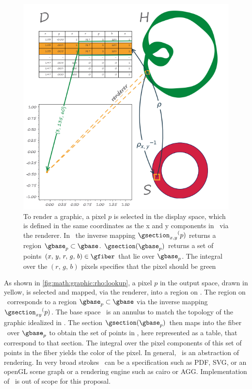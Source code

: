 \documentclass[../main.tex]{subfiles}
\begin{document}
\begin{figure}[H]
    \includegraphics[width=\textwidth]{figures/math/render.png}
    \caption{To render a graphic, a pixel $p$ is selected in the display space, which is defined in the same coordinates as the x and y components in \gfiber\ via the renderer. In \gtotal\, the inverse mapping ${\gsection_{x,y}}^(p)$ returns a region $\gbase_{p} \subset \gbase$. $\gsection(\gbase_{p})$ returns a set of points $(x,\,y,\,r,\,g,\,b) \in \gfiber$ that lie over $\gbase_{p}$. The integral over the $(r,\,g,\,b)$ pixels specifies that the pixel should be green}
    \label{fig:math:graphic:rho:lookup}
\end{figure}

As shown in \autoref{fig:math:graphic:rho:lookup}, a pixel $p$ in the output space, drawn in yellow, is selected and mapped, via the renderer, into a region on \gtotal.  The region on \gtotal\ corresponds to a region $\gbase_p \subset \gbase$ via the inverse mapping  ${\gsection_{xy}}^(p)$. The base space \gbase\ is an annulus to match the topology of the graphic idealized in \gtotal. The section  $\gsection(\gbase_{p})$  then maps into the fiber \gfiber\ over $\gbase_p$ to obtain the set of points in \gfiber, here represented as a table, that correspond to that section. The integral over the pixel components of this set of points in the fiber yields the color of the pixel. In general, \gsection\ is an abstraction of rendering. In very broad strokes \gsection\ can be a specification such as PDF\cite{bienz1993portable}, SVG\cite{quintScalable2003}, or an openGL scene graph\cite{CarsonOpenGL1997} or a rendering engine such as cairo\cite{CairographicsOrg} or AGG\cite{shemanarevAntiGrainGeometry}. Implementation of \gsection\ is out of scope for this proposal. 
\end{document}
